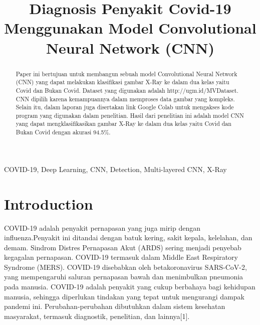\documentclass[conference]{IEEEtran}
\begin{document}
\title{Diagnosis Penyakit Covid-19 Menggunakan Model Convolutional Neural Network (CNN)
}

\author{
}

\maketitle

\begin{abstract}
    Paper ini bertujuan untuk membangun sebuah model Convolutional Neural Network (CNN) yang dapat melakukan klasifikasi gambar X-Ray ke dalam dua kelas yaitu Covid dan Bukan Covid. Dataset yang digunakan adalah http://ugm.id/MVDataset. CNN dipilih karena kemampuannya dalam memproses data gambar yang kompleks. Selain itu, dalam laporan juga disertakan link Google Colab untuk mengakses kode program yang digunakan dalam penelitian. Hasil dari penelitian ini adalah model CNN yang dapat mengklasifikasikan gambar X-Ray ke dalam dua kelas yaitu Covid dan Bukan Covid dengan akurasi 94.5\%.
\end{abstract}

\begin{IEEEkeywords}
COVID-19, Deep Learning, CNN, Detection, Multi-layered CNN, X-Ray
\end{IEEEkeywords}

\section{Introduction}
COVID-19 adalah penyakit pernapasan yang juga mirip dengan influenza.Penyakit ini ditandai dengan batuk kering, sakit kepala, kelelahan, dan demam. Sindrom Distres Pernapasan Akut (ARDS) sering menjadi penyebab kegagalan pernapasan. COVID-19 termasuk dalam Middle East Respiratory Syndrome (MERS). COVID-19 disebabkan oleh betakoronavirus SARS-CoV-2, yang mempengaruhi saluran pernapasan bawah dan menimbulkan pneumonia pada manusia. COVID-19 adalah penyakit yang cukup berbahaya bagi kehidupan manusia, sehingga diperlukan tindakan yang tepat untuk mengurangi dampak pandemi ini. Perubahan-perubahan dibutuhkan dalam sistem kesehatan masyarakat, termasuk diagnostik, penelitian, dan lainnya[1].
\end{document}
